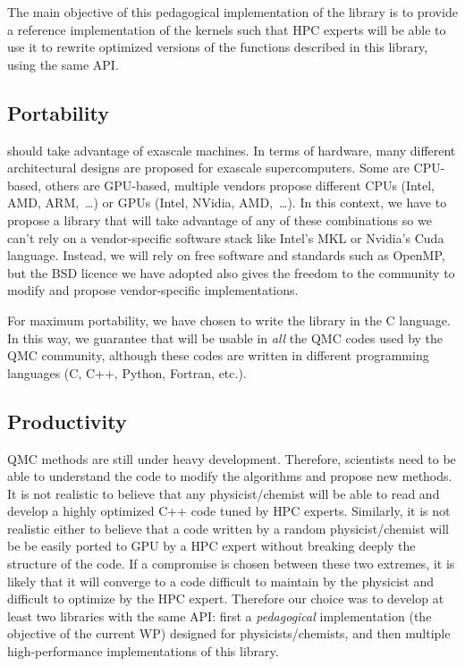 The main objective of this pedagogical implementation of the library
is to provide a reference implementation of the kernels such that
\ac{HPC} experts will be able to use it to rewrite optimized versions
of the functions described in this library, using the same \ac{API}.

\subsection{Portability}

\QMCkl{} should take advantage of exascale machines. In terms of hardware,
many different architectural designs are proposed for exascale
supercomputers. Some are CPU-based, others are \ac{GPU}-based, multiple vendors
propose different CPUs (Intel, AMD, ARM,~\dots) or \acp{GPU} (Intel,
NVidia, AMD,~\dots). In this context, we have to propose a library that
will take advantage of any of these combinations so we can't rely on 
a vendor-specific software stack like Intel's \ac{MKL} or Nvidia's
Cuda language. Instead, we
will rely on free software and standards such as OpenMP, but the BSD
licence we have adopted also gives the freedom to the community to
modify \QMCkl{} and propose vendor-specific implementations.

For maximum portability, we have chosen to write the library in the C
language. In this way, we guarantee that \QMCkl{} will be usable in
\emph{all} the QMC codes used by the \ac{QMC} community, although these
codes are written in different programming languages (C, C++, Python,
Fortran, etc.).

\subsection{Productivity}

\ac{QMC} methods are still under heavy development. Therefore,
scientists need to be able to understand the code to modify the
algorithms and propose new methods. It is not realistic to believe
that any physicist/chemist will be able to read and develop a highly optimized
C++ code tuned by \ac{HPC} experts. Similarly, it is not realistic
either to believe that a code written by a random physicist/chemist will
be be easily ported to \ac{GPU} by a \ac{HPC} expert without breaking deeply the
structure of the code. If a compromise
is chosen between these two extremes, it is likely that it will
converge to a code difficult to maintain by the physicist and
difficult to optimize by the \ac{HPC} expert. Therefore our choice was to
develop at least two libraries with the same \ac{API}: first a
\emph{pedagogical} implementation (the objective of the current \ac{WP})
designed for physicists/chemists, and then multiple high-performance
implementations of this library.

